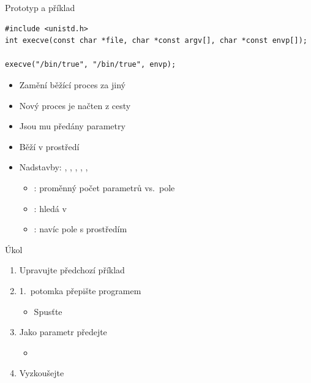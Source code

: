 \begin{frame}[fragile]{}

  \begin{block}{Prototyp a příklad}
    \begin{lstlisting}[aboveskip=2pt,belowskip=2pt]
#include <unistd.h>
int execve(const char *file, char *const argv[], char *const envp[]);

execve("/bin/true", "/bin/true", envp);
    \end{lstlisting}
  \end{block}

  \begin{itemize}
    \item Zamění běžící proces za jiný

    \pause

    \item Nový proces je načten z cesty 
    \item Jsou mu předány parametry 
    \item Běží v prostředí 

    \pause

    \item Nadstavby: , , , ,
      , 
    \begin{itemize}
      \item {}: proměnný počet parametrů vs.\ pole
      \item {}: hledá  v 
      \item {}: navíc pole s prostředím
    \end{itemize}

  \end{itemize}

\end{frame}

\begin{frame}{Úkol}

  \begin{enumerate}
    \item Upravujte předchozí příklad
    \item 1.\ potomka přepište programem 
    \begin{itemize}
      \item Spusťte 
    \end{itemize}

    \item Jako parametr předejte 
    \begin{itemize}
      \item {}
    \end{itemize}

    \item Vyzkoušejte
  \end{enumerate}

\end{frame}

